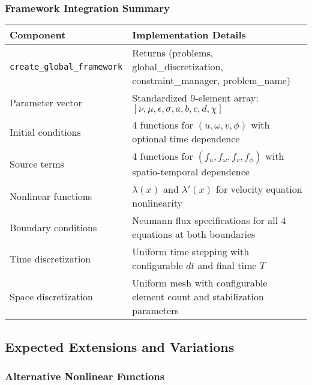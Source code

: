 \subsubsection{Framework Integration Summary}

\begin{longtable}{|p{5cm}|p{8cm}|}
\hline
\textbf{Component} & \textbf{Implementation Details} \\
\hline
\endhead

\texttt{create\_global\_framework} & Returns (problems, global\_discretization, constraint\_manager, problem\_name) \\
\hline

Parameter vector & Standardized 9-element array: $[\nu, \mu, \epsilon, \sigma, a, b, c, d, \chi]$ \\
\hline

Initial conditions & 4 functions for $(u, \omega, v, \phi)$ with optional time dependence \\
\hline

Source terms & 4 functions for $(f_u, f_\omega, f_v, f_\phi)$ with spatio-temporal dependence \\
\hline

Nonlinear functions & $\lambda(x)$ and $\lambda'(x)$ for velocity equation nonlinearity \\
\hline

Boundary conditions & Neumann flux specifications for all 4 equations at both boundaries \\
\hline

Time discretization & Uniform time stepping with configurable $dt$ and final time $T$ \\
\hline

Space discretization & Uniform mesh with configurable element count and stabilization parameters \\
\hline

\end{longtable}

\subsection{Expected Extensions and Variations}
\label{subsec:expected_extensions}

\subsubsection{Alternative Nonlinear Functions}

